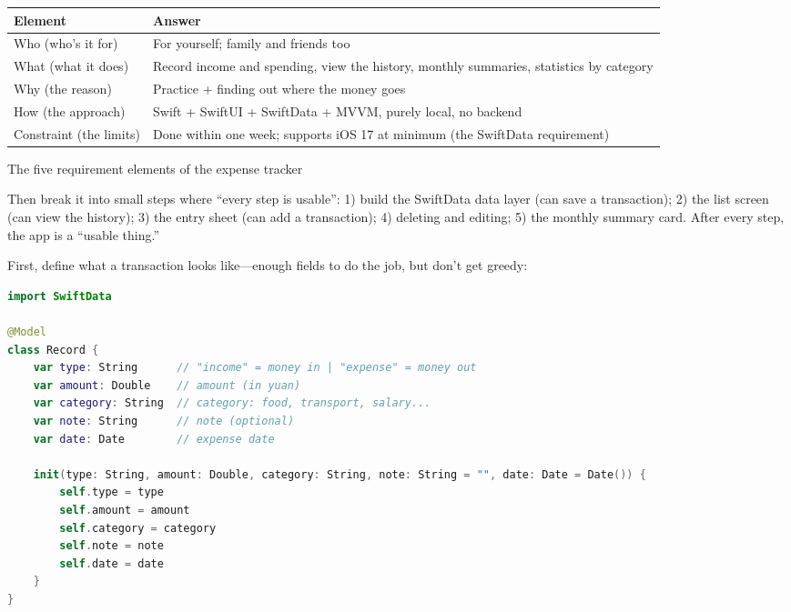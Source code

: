 


\begin{center}
\begin{tabularx}{\linewidth}{|X|X|}
\hline
\textbf{Element} & \textbf{Answer} \tabularnewline
\hline
Who (who's it for) & For yourself; family and friends too \tabularnewline
What (what it does) & Record income and spending, view the history, monthly summaries, statistics by category \tabularnewline
Why (the reason) & Practice + finding out where the money goes \tabularnewline
How (the approach) & Swift + SwiftUI + SwiftData + MVVM, purely local, no backend \tabularnewline
Constraint (the limits) & Done within one week; supports iOS 17 at minimum (the SwiftData requirement) \tabularnewline
\hline
\end{tabularx}
\end{center}

\begin{center}\small\color{gray}The five requirement elements of the expense tracker\end{center}

Then break it into small steps where “every step is usable”: 1) build the SwiftData data layer (can save a transaction); 2) the list screen (can view the history); 3) the entry sheet (can add a transaction); 4) deleting and editing; 5) the monthly summary card. After every step, the app is a “usable thing.”


First, define what a transaction looks like—enough fields to do the job, but don't get greedy:

\begin{lstlisting}[language=Swift]
import SwiftData

@Model
class Record {
    var type: String      // "income" = money in | "expense" = money out
    var amount: Double    // amount (in yuan)
    var category: String  // category: food, transport, salary...
    var note: String      // note (optional)
    var date: Date        // expense date

    init(type: String, amount: Double, category: String, note: String = "", date: Date = Date()) {
        self.type = type
        self.amount = amount
        self.category = category
        self.note = note
        self.date = date
    }
}
\end{lstlisting}

